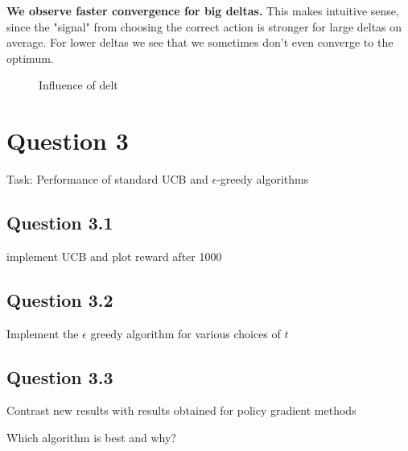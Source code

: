 \documentclass[a4paper, 11pt]{article} %
\begin{document}
\textbf{We observe faster convergence for big deltas.} This makes intuitive sense, since the "signal" from choosing the correct action is stronger for large deltas on average. For lower deltas we see that we sometimes don't even converge to the optimum.

   \begin{figure}[!htb]
        \caption{\label{fig:my-label} Influence of delt}
      \end{figure}
      
\newpage

\section*{Question 3}

Task: Performance of standard UCB and $\epsilon$-greedy algorithms 

\subsection*{Question 3.1}

implement UCB and plot reward after 1000

\subsection*{Question 3.2}

Implement the $\epsilon$ greedy algorithm for various choices of $t$

\subsection*{Question 3.3}

Contrast new results with results obtained for policy gradient methods

Which algorithm is best and why?
\end{document}
